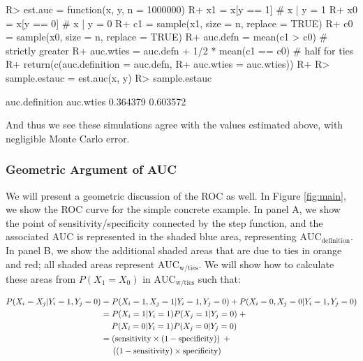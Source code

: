 \documentclass[article]{jss}
\begin{document}
\begin{CodeChunk}

\begin{CodeInput}
R> est.auc = function(x, y, n = 1000000) {
R+   x1 = x[y == 1] # x | y = 1
R+   x0 = x[y == 0] # x | y = 0
R+   c1 = sample(x1, size = n, replace = TRUE)
R+   c0 = sample(x0, size = n, replace = TRUE)
R+   auc.defn = mean(c1 > c0) # strictly greater
R+   auc.wties = auc.defn + 1/2 * mean(c1 == c0) # half for ties
R+   return(c(auc.definition = auc.defn,
R+            auc.wties = auc.wties))
R+ }
R> sample.estauc = est.auc(x, y)
R> sample.estauc
\end{CodeInput}

\begin{CodeOutput}
auc.definition      auc.wties 
      0.364379       0.603572 
\end{CodeOutput}
\end{CodeChunk}

And thus we see these simulations agree with the values estimated above,
with negligible Monte Carlo error.

\hypertarget{geometric-argument-of-auc}{%
\subsubsection{Geometric Argument of
AUC}\label{geometric-argument-of-auc}}

We will present a geometric discussion of the ROC as well. In Figure
\ref{fig:main}, we show the ROC curve for the simple concrete example.
In panel A, we show the point of sensitivity/specificity connected by
the step function, and the associated AUC is represented in the shaded
blue area, representing \(\text{AUC}_{\text{definition}}\). In panel B,
we show the additional shaded areas that are due to ties in orange and
red; all shaded areas represent \(\text{AUC}_{\text{w/ties}}\). We will
show how to calculate these areas from \(P(X_{1} = X_{0})\) in
\(\text{AUC}_{\text{w/ties}}\) such that:

\begin{align*}
P(X_{i} = X_{j} | Y_{i} = 1, Y_{j} = 0) &= P(X_{i} = 1, X_{j} = 1 | Y_{i} = 1, Y_{j} = 0) + P(X_{i} = 0, X_{j} = 0 | Y_{i} = 1, Y_{j} = 0) \\
&= P(X_{i} = 1 | Y_{i} = 1) P(X_{j} = 1 | Y_{j} = 0) \;+ \\
&\hspace{1.3em} P(X_{i} = 0 | Y_{i} = 1) P(X_{j} = 0 | Y_{j} = 0) \\
&= \left(\text{sensitivity} \times (1 - \text{specificity})\right) \;+ \\
&\hspace{1.3em} \left((1- \text{sensitivity}) \times \text{specificity}\right)
\end{align*}
\end{document}
